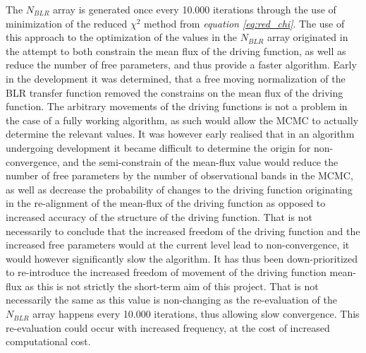 \documentclass[a4paper, 12pt, twoside]{article}
\begin{document}
The $N_{BLR}$ array is generated once every 10.000 iterations through the use of minimization of the reduced $\chi^{2}$ method from \emph{equation \ref{eq:red_chi}}. The use of this approach to the optimization of the values in the $N_{BLR}$ array originated in the attempt to both constrain the mean flux of the driving function, as well as reduce the number of free parameters, and thus provide a faster algorithm. Early in the development it was determined, that a free moving normalization of the BLR transfer function removed the constrains on the mean flux of the driving function. The arbitrary movements of the driving functions is not a problem in the case of a fully working algorithm, as such would allow the MCMC to actually determine the relevant values. It was however early realised that in an algorithm undergoing development it became difficult to determine the origin for non-convergence, and the semi-constrain of the mean-flux value would reduce the number of free parameters by the number of observational bands in the MCMC, as well as decrease the probability of changes to the driving function originating in the re-alignment of the mean-flux of the driving function as opposed to increased accuracy of the structure of the driving function. That is not necessarily to conclude that the increased freedom of the driving function and the increased free parameters would at the current level lead to non-convergence, it would however significantly slow the algorithm. It has thus been down-prioritized to re-introduce the increased freedom of movement of the driving function mean-flux as this is not strictly the short-term aim of this project. That is not necessarily the same as this value is non-changing as the re-evaluation of the $N_{BLR}$ array happens every 10.000 iterations, thus allowing slow convergence. This re-evaluation could occur with increased frequency, at the cost of increased computational cost. \\
\\
\end{document}
